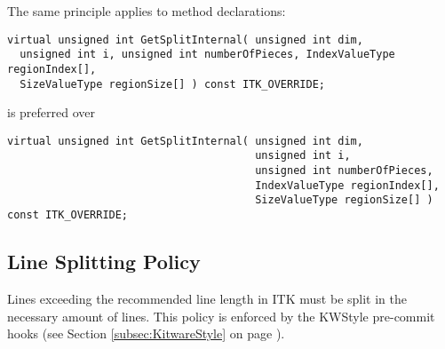 The same principle applies to method declarations:

\small
\begin{verbatim}
virtual unsigned int GetSplitInternal( unsigned int dim,
  unsigned int i, unsigned int numberOfPieces, IndexValueType regionIndex[],
  SizeValueType regionSize[] ) const ITK_OVERRIDE;
\end{verbatim}
\normalsize

is preferred over

\small
\begin{verbatim}
virtual unsigned int GetSplitInternal( unsigned int dim,
                                       unsigned int i,
                                       unsigned int numberOfPieces,
                                       IndexValueType regionIndex[],
                                       SizeValueType regionSize[] ) const ITK_OVERRIDE;
\end{verbatim}
\normalsize


\subsection{Line Splitting Policy}
\label{subsec:LineSplittingPolicy}

Lines exceeding the recommended line length in ITK must be split in the
necessary amount of lines. This policy is enforced by the KWStyle pre-commit
hooks (see Section \ref{subsec:KitwareStyle} on page
\pageref{subsec:KitwareStyle}).

